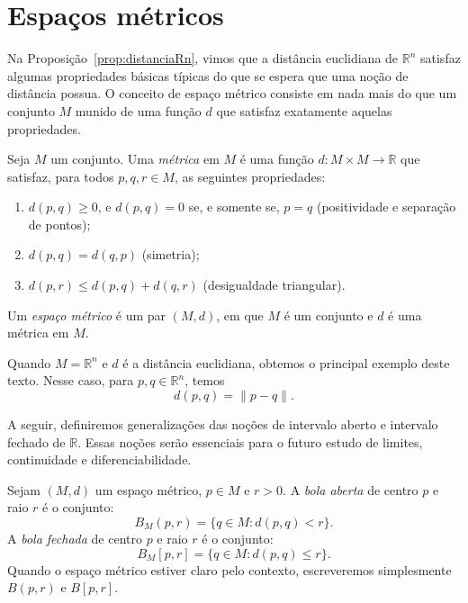 \section{Espaços métricos}

Na Proposição~\ref{prop:distanciaRn}, vimos que a distância euclidiana de $\mathbb R^n$ satisfaz algumas propriedades básicas típicas do que se espera que uma noção de distância possua.
O conceito de espaço métrico consiste em nada mais do que um conjunto $M$ munido de uma função $d$ que satisfaz exatamente aquelas propriedades.

\begin{definition}\label{def:espMetrico}
    Seja $M$ um conjunto.
    Uma \emph{métrica} em $M$ é uma função $d:M\times M\to \mathbb R$ que satisfaz, para todos $p,q,r\in M$, as seguintes propriedades:
    \begin{enumerate}[label=(\roman*)]
        \item $d(p,q)\geq 0$, e $d(p,q)=0$ se, e somente se, $p=q$ \quad (positividade e separação de pontos);
        \item $d(p,q)=d(q,p)$ \quad (simetria);
        \item $d(p,r)\leq d(p,q)+d(q,r)$ \quad (desigualdade triangular).
    \end{enumerate}
    Um \emph{espaço métrico} é um par $(M,d)$, em que $M$ é um conjunto e $d$ é uma métrica em $M$.
\end{definition}

\begin{example}
    Quando $M=\mathbb R^n$ e $d$ é a distância euclidiana, obtemos o principal exemplo deste texto.
    Nesse caso, para $p,q\in\mathbb R^n$, temos
    \[
        d(p,q)=\|p-q\|.
    \]
\end{example}

A seguir, definiremos generalizações das noções de intervalo aberto e intervalo fechado de $\mathbb R$.
Essas noções serão essenciais para o futuro estudo de limites, continuidade e diferenciabilidade.

\begin{definition}
    Sejam $(M,d)$ um espaço métrico, $p \in M$ e $r>0$.
    A \emph{bola aberta} de centro $p$ e raio $r$ é o conjunto:
    \begin{equation*}
        B_M(p, r) = \{q \in M : d(p, q) < r\}.
    \end{equation*}
    A \emph{bola fechada} de centro $p$ e raio $r$ é o conjunto:
    \begin{equation*}
        B_M[p, r] = \{q \in M : d(p, q) \leq r\}.
    \end{equation*}
    Quando o espaço métrico estiver claro pelo contexto, escreveremos simplesmente $B(p,r)$ e $B[p,r]$.
\end{definition}

